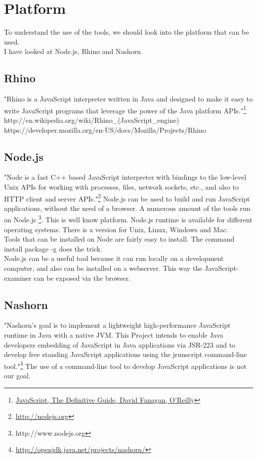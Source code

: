 \documentclass{article}
\begin{document}
\section{Platform}
To understand the use of the tools, we should look into the platform that can be used.\\
I have looked at Node.js, Rhino and Nashorn.

\subsection{Rhino}
"Rhino is a JavaScript interpreter written in Java and designed to make it easy to write JavaScript programs 
that leverage the power of the Java platform APIs."\footnote{\url{JavaScript, The Definitive Guide, David Fanagan, O'Reilly}}\newline
http://en.wikipedia.org/wiki/Rhino\_(JavaScript\_engine)
https://developer.mozilla.org/en-US/docs/Mozilla/Projects/Rhino

\subsection{Node.js}
"Node is a fast C++ based JavaScript interpreter with bindings to the low-level 
Unix APIs for working with processes, files, network sockets, etc., and also to 
HTTP client and server APIs."\footnote{\url{http://nodejs.org}}
Node.js can be used to build and run JavaScript applications, without the need of a browser.
A numerous amount of the tools run on Node.js \footnote{http://www.nodejs.org}. This is well know platform.
Node.js runtime is available for different operating systems.
There is a version for Unix, Linux, Windows and Mac.\\
Tools that can be installed on Node are fairly easy to install. The command install package -g does the trick.\\
Node.js can be a useful tool because it can run locally on a development computer, and also can be installed on a webserver.
This way the JavaScript-examiner can be exposed via the browser.

\subsection{Nashorn}
"Nashorn's goal is to implement a lightweight high-performance JavaScript runtime in Java with a native JVM.
This Project intends to enable Java developers embedding of JavaScript in Java applications via JSR-223 and to develop 
free standing JavaScript applications using the jrunscript command-line tool."\footnote{\url{http://openjdk.java.net/projects/nashorn/}}
The use of a command-line tool to develop JavaScript applications is not our goal.
\end{document}
